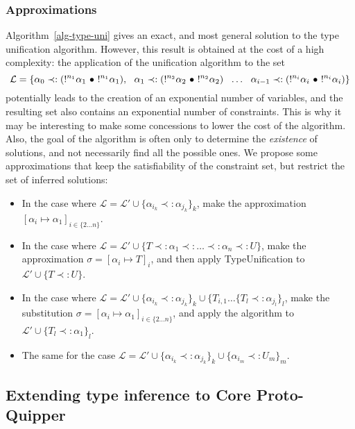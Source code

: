 \subsubsection{Approximations}

Algorithm~\ref{alg-type-uni} gives an exact, and most general solution to the type unification algorithm. However, this result is obtained at the cost of a high complexity:
the application of the unification algorithm to the set
{ \small
	$$\mathcal{L} = \{\alpha_0 \prec: (!^{n_1}\alpha_1 ~\bullet~ !^{n_1}\alpha_1), ~~ 
	\alpha_1 \prec: (!^{n_2}\alpha_2 ~\bullet~ !^{n_2}\alpha_2) ~~ \dots ~~ \alpha_{i-1} \prec: (!^{n_i}\alpha_i ~\bullet~ !^{n_i}\alpha_{i}) \}$$ }
potentially leads to the creation of an exponential number of variables, and the resulting set also contains an exponential number of
constraints.
This is why it may be interesting to make some concessions to lower the cost of the algorithm. Also, the goal of the algorithm is
often only to determine the {\em existence} of solutions, and not necessarily find all the possible ones.
We propose some approximations that keep the satisfiability of the constraint set, but restrict the set of inferred solutions:
	
\begin{itemize}
	\item In the case where $\mathcal{L} = \mathcal{L'} \cup \{\alpha_{i_k} \prec: \alpha_{j_k} \}_k$,
		make the approximation ${[\alpha_i \mapsto \alpha_1]_{i \in \{2 \dots n\}}}$.
		
	\item In the case where $\mathcal{L} = \mathcal{L'} \cup \{T \prec: \alpha_1 \prec: \dots \prec: \alpha_n \prec: U\}$, make the
		approximation $\sigma = [\alpha_i \mapsto T]_i$, and then apply TypeUnification to $\mathcal{L'} \cup \{ T \prec: U \}$.
		
	\item In the case where $\mathcal{L} = \mathcal{L'} \cup \{\alpha_{i_k} \prec: \alpha_{j_k}\}_k \cup
		\{T_{i, 1} \dots \{T_l \prec: \alpha_{j_l} \}_l$, make the substitution $\sigma = {[\alpha_i \mapsto \alpha_1]_{i \in \{2 \dots n\}}}$,
		and apply the algorithm to $\mathcal{L'} \cup \{T_l \prec: \alpha_1\}_l$.
		
	\item The same for the case $\mathcal{L} = \mathcal{L'} \cup \{\alpha_{i_k} \prec: \alpha_{j_k}\}_k \cup \{\alpha_{i_m} \prec: U_m\}_m$.
\end{itemize}

\subsection{Extending type inference to Core Proto-Quipper}
\label{ssec-extending-to-QP}

